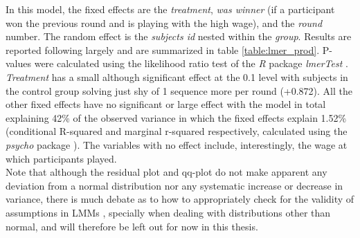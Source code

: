 In this model, the fixed effects are the \textit{treatment}, \textit{was winner} (if a participant won the previous round and is playing with the high wage), and the \textit{round} number. The random effect is the \textit{subjects id} nested within the \textit{group}. Results are reported following largely \cite{barr2013} and are summarized in table \ref{table:lmer_prod}. P-values were calculated using the likelihood ratio test of the \textit{R} package \textit{lmerTest} \citep{kuznetsova2017}.\\

\textit{Treatment} has a small although significant effect at the 0.1 level with subjects in the control group solving just shy of 1 sequence more per round (+0.872). All the other fixed effects have no significant or large effect with the model in total explaining 42\% of the observed variance in which the fixed effects explain 1.52\% (conditional R-squared and marginal r-squared respectively, calculated using the \textit{psycho} package \citep{makowski2018}). The variables with no effect include, interestingly, the wage at which participants played.\\

Note that although the residual plot and qq-plot do not make apparent any deviation from a normal distribution nor any systematic increase or decrease in variance, there is much debate as to how to appropriately check for the validity of assumptions in LMMs  \citep{loy2017}, specially when dealing with distributions other than normal, and will therefore be left out for now in this thesis.\\

